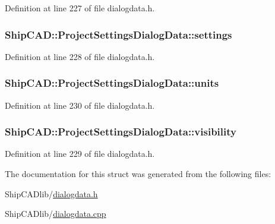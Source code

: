 Definition at line 227 of file dialogdata.\+h.

\subsubsection[{\texorpdfstring{settings}{settings}}]{ Ship\+C\+A\+D\+::\+Project\+Settings\+Dialog\+Data\+::settings}\hypertarget{structShipCAD_1_1ProjectSettingsDialogData_ae6f280accdfe3f4d212a5f1eec023c16}{}\label{structShipCAD_1_1ProjectSettingsDialogData_ae6f280accdfe3f4d212a5f1eec023c16}


Definition at line 228 of file dialogdata.\+h.

\subsubsection[{\texorpdfstring{units}{units}}]{ Ship\+C\+A\+D\+::\+Project\+Settings\+Dialog\+Data\+::units}\hypertarget{structShipCAD_1_1ProjectSettingsDialogData_a0c5b5a3e4f840c501ba4e19191050284}{}\label{structShipCAD_1_1ProjectSettingsDialogData_a0c5b5a3e4f840c501ba4e19191050284}


Definition at line 230 of file dialogdata.\+h.

\subsubsection[{\texorpdfstring{visibility}{visibility}}]{ Ship\+C\+A\+D\+::\+Project\+Settings\+Dialog\+Data\+::visibility}\hypertarget{structShipCAD_1_1ProjectSettingsDialogData_a97f37da0a44aaca11963ab6a3d7da218}{}\label{structShipCAD_1_1ProjectSettingsDialogData_a97f37da0a44aaca11963ab6a3d7da218}


Definition at line 229 of file dialogdata.\+h.



The documentation for this struct was generated from the following files\+:\begin{DoxyCompactItemize}
\item 
Ship\+C\+A\+Dlib/\hyperlink{dialogdata_8h}{dialogdata.\+h}\item 
Ship\+C\+A\+Dlib/\hyperlink{dialogdata_8cpp}{dialogdata.\+cpp}\end{DoxyCompactItemize}
